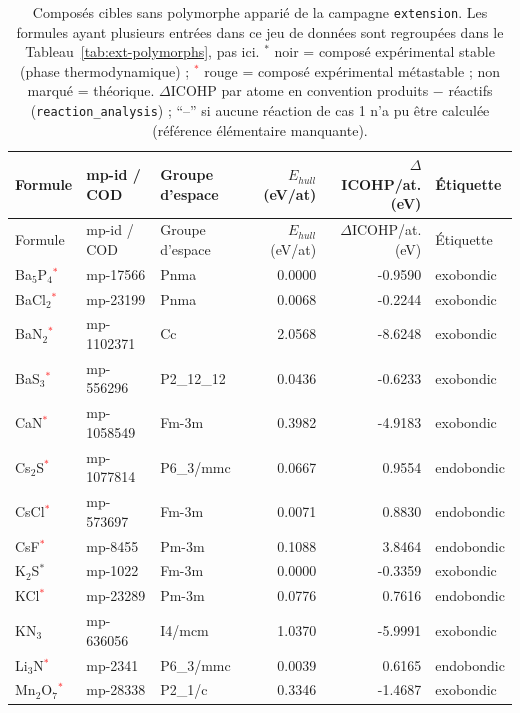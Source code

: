 \begin{longtable}{@{}lllrrl@{}}
\caption{Composés cibles sans polymorphe apparié de la campagne \texttt{extension}. Les formules ayant plusieurs entrées dans ce jeu de données sont regroupées dans le Tableau~\ref{tab:ext-polymorphs}, pas ici. $^*$ noir = composé expérimental stable (phase thermodynamique) ; \textcolor{red}{$^*$} rouge = composé expérimental métastable ; non marqué = théorique. $\Delta$ICOHP par atome en convention produits $-$ réactifs (\texttt{reaction\_analysis}) ; ``--'' si aucune réaction de cas 1 n'a pu être calculée (référence élémentaire manquante).}\\
\toprule
Formule & mp-id / COD & Groupe d'espace & $E_{hull}$ (eV/at) & $\Delta$ICOHP/at. (eV) & Étiquette \\
\midrule
\endfirsthead
\toprule
Formule & mp-id / COD & Groupe d'espace & $E_{hull}$ (eV/at) & $\Delta$ICOHP/at. (eV) & Étiquette \\
\midrule
\endhead
\bottomrule
\endfoot
Ba$_{5}$P$_{4}$\textcolor{red}{$^*$} & mp-17566 & Pnma & 0.0000 & -0.9590 & exobondic \\
BaCl$_{2}$\textcolor{red}{$^*$} & mp-23199 & Pnma & 0.0068 & -0.2244 & exobondic \\
BaN$_{2}$\textcolor{red}{$^*$} & mp-1102371 & Cc & 2.0568 & -8.6248 & exobondic \\
BaS$_{3}$\textcolor{red}{$^*$} & mp-556296 & P2\_12\_12 & 0.0436 & -0.6233 & exobondic \\
CaN\textcolor{red}{$^*$} & mp-1058549 & Fm-3m & 0.3982 & -4.9183 & exobondic \\
Cs$_{2}$S\textcolor{red}{$^*$} & mp-1077814 & P6\_3/mmc & 0.0667 & 0.9554 & endobondic \\
CsCl\textcolor{red}{$^*$} & mp-573697 & Fm-3m & 0.0071 & 0.8830 & endobondic \\
CsF\textcolor{red}{$^*$} & mp-8455 & Pm-3m & 0.1088 & 3.8464 & endobondic \\
K$_{2}$S$^*$ & mp-1022 & Fm-3m & 0.0000 & -0.3359 & exobondic \\
KCl\textcolor{red}{$^*$} & mp-23289 & Pm-3m & 0.0776 & 0.7616 & endobondic \\
KN$_{3}$ & mp-636056 & I4/mcm & 1.0370 & -5.9991 & exobondic \\
Li$_{3}$N\textcolor{red}{$^*$} & mp-2341 & P6\_3/mmc & 0.0039 & 0.6165 & endobondic \\
Mn$_{2}$O$_{7}$\textcolor{red}{$^*$} & mp-28338 & P2\_1/c & 0.3346 & -1.4687 & exobondic \\

\end{longtable}
